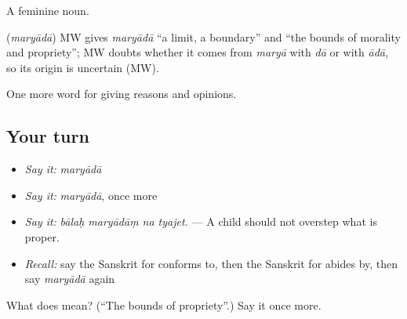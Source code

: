 A feminine noun.

\begin{cousinweb}
\textbf{} (\emph{maryādā}) MW gives \emph{maryādā} \textquotedblleft{}a limit, a boundary\textquotedblright{} and \textquotedblleft{}the bounds of morality and propriety\textquotedblright{}; MW doubts whether it comes from \emph{maryā} with \emph{dā} or with \emph{ādā}, so its origin is uncertain (MW).
\end{cousinweb}

\begin{grammarlens}[title={What you've built}]
One more word for giving reasons and opinions.
\end{grammarlens}

\subsection*{Your turn}
\begin{itemize}
\raggedright
  \item \emph{Say it:} \emph{maryādā}
  \item \emph{Say it:} \emph{maryādā}, once more
  \item \emph{Say it:} \emph{bālaḥ maryādāṃ na tyajet.} — A child should not overstep what is proper.
  \item \emph{Recall:} say the Sanskrit for conforms to, then the Sanskrit for abides by, then say \emph{maryādā} again
\end{itemize}

\begin{tcolorbox}[breakable,colback=teal!4,colframe=teal!35!black,title={Before you move on}]
What does  mean? (\textquotedblleft{}The bounds of propriety\textquotedblright{}.) Say it once more.
\end{tcolorbox}

